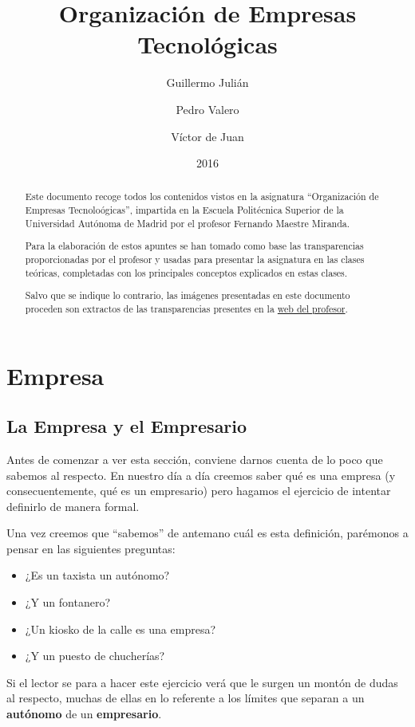 \documentclass[nochap,palatino,shortheader]{apuntes}
\title{Organización de Empresas Tecnológicas}
\author{Guillermo Julián\and Pedro Valero \and Víctor de Juan}
\date{2016}
\begin{document}
\pagestyle{plain}

\begin{abstract}
Este documento recoge todos los contenidos vistos en la asignatura ``Organización de Empresas Tecnoloógicas'', impartida en la Escuela Politécnica Superior de la Universidad Autónoma de Madrid por el profesor Fernando Maestre Miranda.

Para la elaboración de estos apuntes se han tomado como base las transparencias proporcionadas por el profesor y usadas para presentar la asignatura en las clases teóricas, completadas con los principales conceptos explicados en estas clases.

Salvo que se indique lo contrario, las imágenes presentadas en este documento proceden son extractos de las transparencias presentes en la \href{http://maestremiranda.com}{web del profesor}.
\end{abstract}

\maketitle

\tableofcontents
\newpage
\section{Empresa}

\subsection{La Empresa y el Empresario}

Antes de comenzar a ver esta sección, conviene darnos cuenta de lo poco que sabemos al respecto. En nuestro día a día creemos saber qué es una empresa (y consecuentemente, qué es un empresario) pero hagamos el ejercicio de intentar definirlo de manera formal.

Una vez creemos que ``sabemos'' de antemano cuál es esta definición, parémonos a pensar en las siguientes preguntas:

\begin{itemize}
\item ¿Es un taxista un autónomo?
\item ¿Y un fontanero?
\item ¿Un kiosko de la calle es una empresa?
\item ¿Y un puesto de chucherías?
\end{itemize}

Si el lector se para a hacer este ejercicio verá que le surgen un montón de dudas al respecto, muchas de ellas en lo referente a los límites que separan a un \textbf{autónomo} de un \textbf{empresario}.
\end{document}

